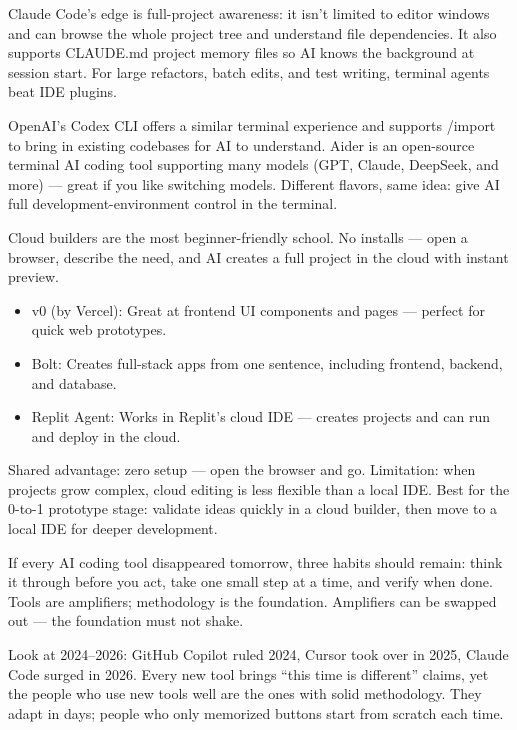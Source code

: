 Claude Code's edge is full-project awareness: it isn't limited to editor windows and can browse the whole project tree and understand file dependencies. It also supports CLAUDE.md project memory files so AI knows the background at session start. For large refactors, batch edits, and test writing, terminal agents beat IDE plugins.


OpenAI's Codex CLI offers a similar terminal experience and supports /import to bring in existing codebases for AI to understand. Aider is an open-source terminal AI coding tool supporting many models (GPT, Claude, DeepSeek, and more) — great if you like switching models. Different flavors, same idea: give AI full development-environment control in the terminal.


Cloud builders are the most beginner-friendly school. No installs — open a browser, describe the need, and AI creates a full project in the cloud with instant preview.

\begin{itemize}
  \item v0 (by Vercel): Great at frontend UI components and pages — perfect for quick web prototypes.
  \item Bolt: Creates full-stack apps from one sentence, including frontend, backend, and database.
  \item Replit Agent: Works in Replit's cloud IDE — creates projects and can run and deploy in the cloud.
\end{itemize}

Shared advantage: zero setup — open the browser and go. Limitation: when projects grow complex, cloud editing is less flexible than a local IDE. Best for the 0-to-1 prototype stage: validate ideas quickly in a cloud builder, then move to a local IDE for deeper development.


If every AI coding tool disappeared tomorrow, three habits should remain: think it through before you act, take one small step at a time, and verify when done. Tools are amplifiers; methodology is the foundation. Amplifiers can be swapped out — the foundation must not shake.

Look at 2024–2026: GitHub Copilot ruled 2024, Cursor took over in 2025, Claude Code surged in 2026. Every new tool brings “this time is different” claims, yet the people who use new tools well are the ones with solid methodology. They adapt in days; people who only memorized buttons start from scratch each time.

